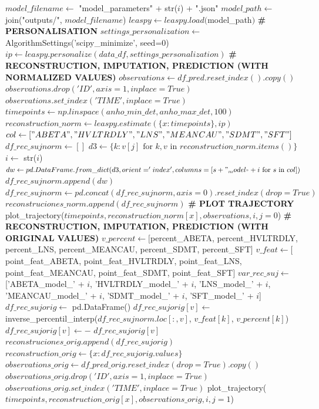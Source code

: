 \begin{description}
	 \begin{algorithm}
	 	\caption{Personalización, Reconstrucción, Imputación y Predicción}
	 	\begin{algorithmic}
	 		\STATE $model\_filename \leftarrow$ "model\_parameters" + str($i$) + ".json"
	 		\STATE $model\_path \leftarrow$ join("outputs/", $model\_filename$)
	 		\STATE $leaspy \leftarrow leaspy.load($model\_path$)$
	 		\STATE \textbf{\# PERSONALISATION}
	 		\STATE $settings\_personalization \leftarrow$ AlgorithmSettings('scipy\_minimize', seed=0)
	 		\STATE $ip \leftarrow leaspy.personalize(data\_df, settings\_personalization)$
	 		\STATE \textbf{\# RECONSTRUCTION, IMPUTATION, PREDICTION (WITH NORMALIZED VALUES)}
	 		\STATE $observations \leftarrow df\_pred.reset\_index().copy()$
	 		\STATE $observations.drop('ID', axis=1, inplace=True)$
	 		\STATE $observations.set\_index('TIME', inplace=True)$
	 		\STATE $timepoints \leftarrow np.linspace(anho\_min\_det, anho\_max\_det, 100)$
	 		\STATE $reconstruction\_norm \leftarrow leaspy.estimate(\{x: timepoints\}, ip)$
	 		\STATE $col \leftarrow ["ABETA", "HVLTRDLY", "LNS", "MEANCAU", "SDMT", "SFT"]$
	 		\STATE $df\_rec\_sujnorm \leftarrow []$
	 		\STATE $d3 \leftarrow \{k: v[j] \text{ for } k, v \text{ in } reconstruction\_norm.items()\}$
	 		\STATE $i \leftarrow$ str($i$)
	 		\STATE $dw \leftarrow pd.DataFrame.from\_dict(d3, orient='index', columns=[s + "_model_" + i \text{ for } s \text{ in } col])$
	 		\STATE $df\_rec\_sujnorm.append(dw)$
	 		\ENDFOR
	 		\STATE $df\_rec\_sujnorm \leftarrow pd.concat(df\_rec\_sujnorm, axis=0).reset\_index(drop=True)$
	 		\STATE $reconstruciones\_norm.append(df\_rec\_sujnorm)$
	 		\STATE \textbf{\# PLOT TRAJECTORY}
	 		\STATE plot\_trajectory($timepoints, reconstruction\_norm[x], observations, i, j=0$)
	 		\STATE \textbf{\# RECONSTRUCTION, IMPUTATION, PREDICTION (WITH ORIGINAL VALUES)}
	 		\STATE $v\_percent \leftarrow [$percent\_ABETA, percent\_HVLTRDLY, percent\_LNS, percent\_MEANCAU, percent\_SDMT, percent\_SFT$]$
	 		\STATE $v\_feat \leftarrow [$point\_feat\_ABETA, point\_feat\_HVLTRDLY, point\_feat\_LNS, point\_feat\_MEANCAU, point\_feat\_SDMT, point\_feat\_SFT$]$
	 		\STATE $var\_rec\_suj \leftarrow$ ['ABETA\_model\_' + $i$, 'HVLTRDLY\_model\_' + $i$, 'LNS\_model\_' + $i$, 'MEANCAU\_model\_' + $i$, 'SDMT\_model\_' + $i$, 'SFT\_model\_' + $i$]
	 		\STATE $df\_rec\_sujorig \leftarrow$ pd.DataFrame()
	 		\STATE $df\_rec\_sujorig[v] \leftarrow$ inverse\_percentil\_interp($df\_rec\_sujnorm.loc[:, v]$, $v\_feat[k]$, $v\_percent[k]$)
	 		\STATE $df\_rec\_sujorig[v] \leftarrow -$ $df\_rec\_sujorig[v]$
	 		\ENDFOR
	 		\STATE $reconstruciones\_orig.append(df\_rec\_sujorig)$
	 		\STATE $reconstruction\_orig \leftarrow \{x: df\_rec\_sujorig.values\}$
	 		\STATE $observations\_orig \leftarrow df\_pred\_orig.reset\_index(drop=True).copy()$
	 		\STATE $observations\_orig.drop('ID', axis=1, inplace=True)$
	 		\STATE $observations\_orig.set\_index('TIME', inplace=True)$
	 		\STATE plot\_trajectory($timepoints, reconstruction\_orig[x], observations\_orig, i, j=1$)
	 		\ENDFOR
	 	\end{algorithmic}
	 \end{algorithm}
	 

\end{description}
